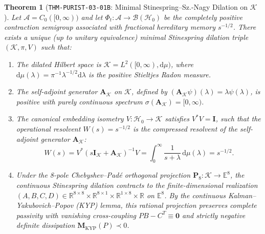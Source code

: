 \documentclass[11pt,a4paper,reqno]{article}
\theoremstyle{plain}
\newtheorem{theorem}{Theorem}[section]
\theoremstyle{definition}
\theoremstyle{remark}
\numberwithin{equation}{section}
\providecommand{\diff}{\mathrm{d}}
\begin{document}
\begin{theorem}[\texttt{THM-PURIST-03-01B}: Minimal Stinespring--Sz.-Nagy Dilation on $\mathcal{K}$]
\label{thm:stinespring_sznagy_dilation}
Let $\mathcal{A} = C_0([0,\infty))$ and let $\Phi_t: \mathcal{A} \to \mathcal{B}(\mathcal{H}_0)$ be the completely positive contraction semigroup associated with fractional hereditary memory $s^{-1/2}$. There exists a unique (up to unitary equivalence) minimal Stinespring dilation triple $(\mathcal{K}, \pi, V)$ such that:
\begin{enumerate}[label=\textbf{(\alph*)},leftmargin=1.8em]
  \item The dilated Hilbert space is $\mathcal{K} = L^2([0,\infty), \diff\mu)$, where $\diff\mu(\lambda) = \pi^{-1} \lambda^{-1/2} \diff\lambda$ is the positive Stieltjes Radon measure.
  \item The self-adjoint generator $\mathbf{A}_{\mathcal{K}}$ on $\mathcal{K}$, defined by $(\mathbf{A}_{\mathcal{K}} \psi)(\lambda) = \lambda \psi(\lambda)$, is positive with purely continuous spectrum $\sigma(\mathbf{A}_{\mathcal{K}}) = [0, \infty)$.
  \item The canonical embedding isometry $V: \mathcal{H}_0 \to \mathcal{K}$ satisfies $V^* V = \mathbf{I}$, such that the operational resolvent $W(s) = s^{-1/2}$ is the compressed resolvent of the self-adjoint generator $\mathbf{A}_{\mathcal{K}}$:
  \begin{equation}
    W(s) = V^* \left( s \mathbf{I}_{\mathcal{K}} + \mathbf{A}_{\mathcal{K}} \right)^{-1} V = \int_0^\infty \frac{1}{s + \lambda}\,\diff\mu(\lambda) = s^{-1/2}.
    \label{eq:stinespring_resolvent_formula}
  \end{equation}
  \item Under the 8-pole Chebyshev--Pad\'{e} orthogonal projection $\mathbf{P}_8: \mathcal{K} \to \mathbb{E}^8$, the continuous Stinespring dilation contracts to the finite-dimensional realization $(A, B, C, D) \in \mathbb{R}^{8 \times 8} \times \mathbb{R}^{8 \times 1} \times \mathbb{R}^{1 \times 8} \times \mathbb{R}$ on $\mathbb{E}^8$. By the continuous Kalman--Yakubovich--Popov (KYP) lemma, this rational projection preserves complete passivity with vanishing cross-coupling $PB - C^T \equiv \bm{0}$ and strictly negative definite dissipation $\mathbf{M}_{\mathrm{KYP}}(P) \prec 0$.
\end{enumerate}
\end{theorem}
\end{document}
